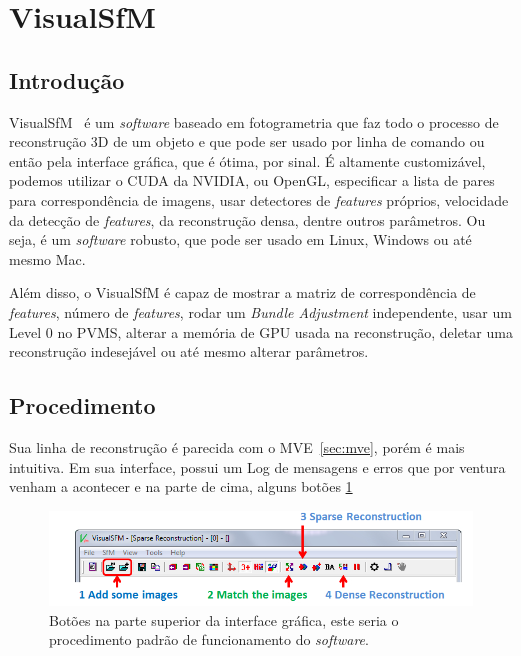 \section{VisualSfM}\label{sec:visualsfm}
%
\subsection*{Introdução}

VisualSfM~\cite{wu2011visualsfm} é um \emph{software} baseado em fotogrametria que faz todo o processo de reconstrução 3D de um objeto e que pode ser usado por linha de comando ou então pela interface gráfica, que é ótima, por sinal. É altamente customizável, podemos utilizar o CUDA da NVIDIA, ou OpenGL, especificar a lista de pares para correspondência de imagens, usar detectores de \emph{features} próprios, velocidade da detecção de \emph{features}, da reconstrução densa, dentre outros parâmetros. Ou seja, é um \emph{software} robusto, que pode ser usado em Linux, Windows ou até mesmo Mac.

Além disso, o VisualSfM é capaz de mostrar a matriz de correspondência de \emph{features}, número de \emph{features}, rodar um \emph{Bundle Adjustment} independente, usar um Level 0 no PVMS, alterar a memória de GPU usada na reconstrução, deletar uma reconstrução indesejável ou até mesmo alterar parâmetros.

\subsection*{Procedimento}

Sua linha de reconstrução é parecida com o MVE~\ref{sec:mve}, porém é mais intuitiva. Em sua interface, possui um Log de mensagens e erros que por ventura venham a acontecer e na parte de cima, alguns botões \ref{fig:pipelineVisualSfM}

\begin{figure}[!h]
	\centering
	\includegraphics[width=1\linewidth]{figs/pipelinevisualsfm.png}
	\caption{%
	Botões na parte superior da interface gráfica, este seria o procedimento padrão de funcionamento do \emph{software}.
	\protect\cite{wu2011visualsfm}
	}\label{fig:pipelineVisualSfM}
\end{figure}

